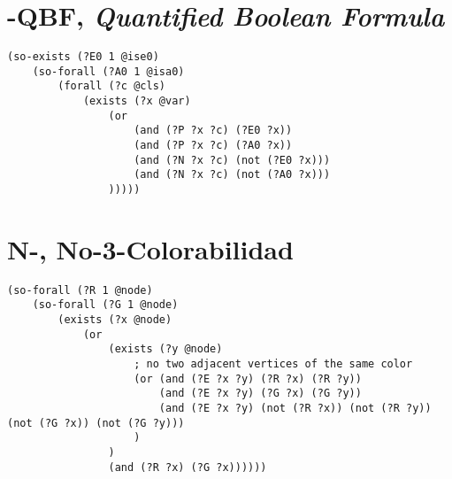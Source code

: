 \section{\qEA-QBF, \textit{Quantified Boolean Formula}}
\begin{verbatim}
(so-exists (?E0 1 @ise0)
    (so-forall (?A0 1 @isa0)
        (forall (?c @cls)
            (exists (?x @var)
                (or
                    (and (?P ?x ?c) (?E0 ?x))
                    (and (?P ?x ?c) (?A0 ?x))
                    (and (?N ?x ?c) (not (?E0 ?x)))
                    (and (?N ?x ?c) (not (?A0 ?x)))
                )))))
\end{verbatim}

\section{N-\TCOL, No-3-Colorabilidad}

\begin{verbatim}
(so-forall (?R 1 @node)
    (so-forall (?G 1 @node)
        (exists (?x @node)
            (or 
                (exists (?y @node)
                    ; no two adjacent vertices of the same color
                    (or (and (?E ?x ?y) (?R ?x) (?R ?y))
                        (and (?E ?x ?y) (?G ?x) (?G ?y))
                        (and (?E ?x ?y) (not (?R ?x)) (not (?R ?y)) (not (?G ?x)) (not (?G ?y)))
                    )
                )
                (and (?R ?x) (?G ?x))))))
\end{verbatim}
